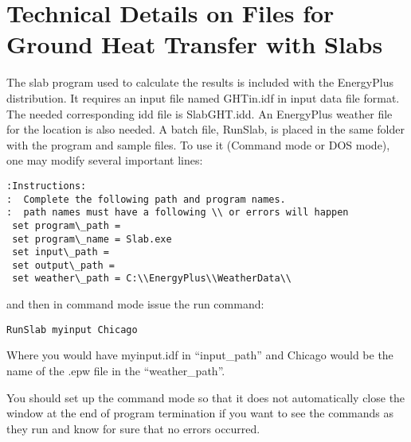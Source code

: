 \section{Technical Details on Files for Ground Heat Transfer with Slabs}\label{technical-details-on-files-for-ground-heat-transfer-with-slabs}

The slab program used to calculate the results is included with the EnergyPlus distribution. It requires an input file named GHTin.idf in input data file format. The needed corresponding idd file is SlabGHT.idd. An EnergyPlus weather file for the location is also needed. A batch file, RunSlab, is placed in the same folder with the program and sample files. To use it (Command mode or DOS mode), one may modify several important lines:

\begin{lstlisting}
:Instructions:
:  Complete the following path and program names.
:  path names must have a following \\ or errors will happen
 set program\_path =
 set program\_name = Slab.exe
 set input\_path =
 set output\_path =
 set weather\_path = C:\\EnergyPlus\\WeatherData\\
\end{lstlisting}

and then in command mode issue the run command:

\begin{lstlisting}
RunSlab myinput Chicago
\end{lstlisting}

Where you would have myinput.idf in ``input\_path'' and Chicago would be the name of the .epw file in the ``weather\_path''.

You should set up the command mode so that it does not automatically close the window at the end of program termination if you want to see the commands as they run and know for sure that no errors occurred.
